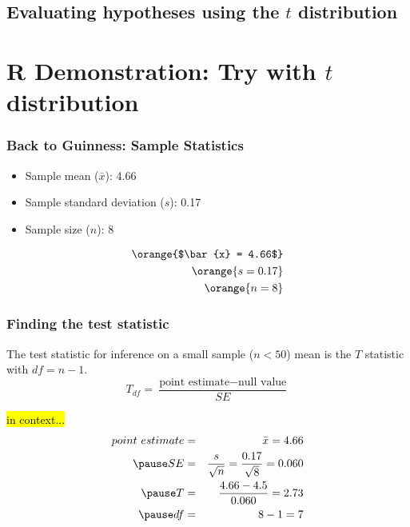 \documentclass[slidestop,compress,mathserif]{beamer}
\begin{document}

\subsection{Evaluating hypotheses using the \texorpdfstring{$t$}{t} distribution}



\section{R Demonstration: Try with \texorpdfstring{$t$}{t} distribution}


\begin{frame}
\frametitle{Back to Guinness: Sample Statistics}

\begin{itemize}
\item Sample mean ($\bar{x}$): 4.66
\item Sample standard deviation ($s$): 0.17
\item Sample size ($n$): 8
\end{itemize}

\begin{align*}
\orange{$\bar{x} = 4.66$} \\
\orange{s = 0.17} \\
\orange{n = 8}
\end{align*}

\end{frame}



\begin{frame}
\frametitle{Finding the test statistic}

{The test statistic for inference on a small sample ($n < 50$) mean is the $T$ statistic with $df = n - 1$.
\[ T_{df} = \frac{\text{point estimate} - \text{null value}}{SE} \]}

\pause

\vspace{-0.5cm}

\hl{in context...}
\begin{eqnarray*}
point~estimate &=& \bar{x} = 4.66 \\
\pause
SE &=& \frac{s}{\sqrt{n}} = \frac{0.17}{\sqrt{8}} = 0.060 \\
\pause
T &=& \frac{4.66 - 4.5}{0.060} = 2.73 \\
\pause
df &=& 8 - 1 = 7
\end{eqnarray*}

\vspace{-0.25cm}


\end{frame}
\end{document}
